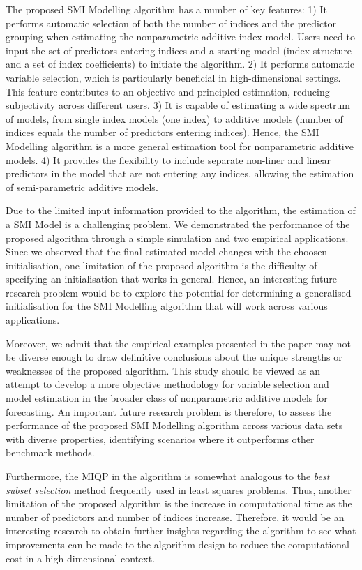 \documentclass[
  11pt,
  a4paper,
]{article}
\begin{document}
The proposed SMI Modelling algorithm has a number of key features: 1) It
performs automatic selection of both the number of indices and the
predictor grouping when estimating the nonparametric additive index
model. Users need to input the set of predictors entering indices and a
starting model (index structure and a set of index coefficients) to
initiate the algorithm. 2) It performs automatic variable selection,
which is particularly beneficial in high-dimensional settings. This
feature contributes to an objective and principled estimation, reducing
subjectivity across different users. 3) It is capable of estimating a
wide spectrum of models, from single index models (one index) to
additive models (number of indices equals the number of predictors
entering indices). Hence, the SMI Modelling algorithm is a more general
estimation tool for nonparametric additive models. 4) It provides the
flexibility to include separate non-liner and linear predictors in the
model that are not entering any indices, allowing the estimation of
semi-parametric additive models.

Due to the limited input information provided to the algorithm, the
estimation of a SMI Model is a challenging problem. We demonstrated the
performance of the proposed algorithm through a simple simulation and
two empirical applications. Since we observed that the final estimated
model changes with the choosen initialisation, one limitation of the
proposed algorithm is the difficulty of specifying an initialisation
that works in general. Hence, an interesting future research problem
would be to explore the potential for determining a generalised
initialisation for the SMI Modelling algorithm that will work across
various applications.

Moreover, we admit that the empirical examples presented in the paper
may not be diverse enough to draw definitive conclusions about the
unique strengths or weaknesses of the proposed algorithm. This study
should be viewed as an attempt to develop a more objective methodology
for variable selection and model estimation in the broader class of
nonparametric additive models for forecasting. An important future
research problem is therefore, to assess the performance of the proposed
SMI Modelling algorithm across various data sets with diverse
properties, identifying scenarios where it outperforms other benchmark
methods.

Furthermore, the MIQP in the algorithm is somewhat analogous to the
\emph{best subset selection} method frequently used in least squares
problems. Thus, another limitation of the proposed algorithm is the
increase in computational time as the number of predictors and number of
indices increase. Therefore, it would be an interesting research to
obtain further insights regarding the algorithm to see what improvements
can be made to the algorithm design to reduce the computational cost in
a high-dimensional context.
\end{document}
